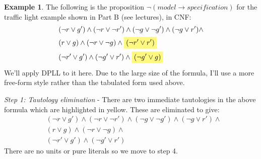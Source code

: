 \documentclass{article}
\theoremstyle{definition}
\newtheorem{example}{Example}
\newcommand{\highlight}[1]{%
  \colorbox{yellow!50}{$\displaystyle#1$}}
\begin{document}
\begin{example}
The following is the proposition $\neg (\textit{model} 
\rightarrow \textit{specification})$ for the traffic light
example shown in Part B (see lectures), in CNF:
%
\begin{align*}
& (\neg r \vee g') \wedge (\neg r \vee \neg r') \wedge (\neg g \vee \neg
  g') \wedge (\neg g \vee r') \wedge \\
& (r \vee g) \wedge (\neg r \vee \neg g) \wedge \highlight{(\neg r' \vee r')} \\
& (\neg r' \vee g') \wedge (\neg g' \vee r') \wedge \highlight{(\neg g' \vee g)}
\end{align*}
%
We'll apply DPLL to it here. Due to the large size of the formula,
I'll use a more free-form style rather than the tabulated form 
used above.

\textit{Step 1: Tautology elimination} - There are two immediate
tautologies in the above formula which are highlighted in yellow.
These are eliminated to give:
%
\begin{align*}
& (\neg r \vee g') \wedge (\neg r \vee \neg r') \wedge (\neg g \vee \neg
  g') \wedge (\neg g \vee r') \wedge \\
& (r \vee g) \wedge (\neg r \vee \neg g) \wedge \\
& (\neg r' \vee g') \wedge (\neg g' \vee r')
\end{align*}
%
There are no units or pure literals so we move to step 4.


\end{example}
\end{document}
